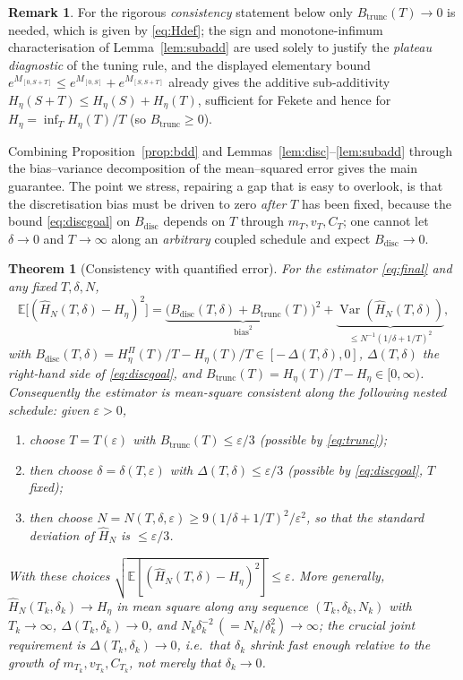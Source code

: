\documentclass{amsart}
\newtheorem{theorem}{Theorem}
\theoremstyle{definition}
\newtheorem{remark}{Remark}
\DeclareMathOperator{\Var}{Var}
\newcommand{\E}{\mathbb{E}}
\begin{document}
\begin{remark}\label{rem:fekete}
For the rigorous \emph{consistency} statement below only $B_{\mathrm{trunc}}(T)\to0$
is needed, which is given by \eqref{eq:Hdef}; the sign and monotone-infimum
characterisation of Lemma~\ref{lem:subadd} are used solely to justify the
\emph{plateau diagnostic} of the tuning rule, and the displayed elementary bound
$e^{M_{[0,S+T]}}\le e^{M_{[0,S]}}+e^{M_{[S,S+T]}}$ already gives the additive
sub-additivity $H_\eta(S+T)\le H_\eta(S)+H_\eta(T)$, sufficient for Fekete and hence
for $H_\eta=\inf_{T}H_\eta(T)/T$ (so $B_{\mathrm{trunc}}\ge0$).
\end{remark}

Combining Proposition~\ref{prop:bdd} and Lemmas~\ref{lem:disc}--\ref{lem:subadd}
through the bias--variance decomposition of the mean--squared error gives the main
guarantee. The point we stress, repairing a gap that is easy to overlook, is that
the discretisation bias must be driven to zero \emph{after} $T$ has been fixed,
because the bound \eqref{eq:discgoal} on $B_{\mathrm{disc}}$ depends on $T$ through
$m_T,v_T,C_T$; one cannot let $\delta\to0$ and $T\to\infty$ along an \emph{arbitrary}
coupled schedule and expect $B_{\mathrm{disc}}\to0$.

\begin{theorem}[Consistency with quantified error]\label{thm:main}
For the estimator \eqref{eq:final} and any fixed $T,\delta,N$,
\begin{equation}\label{eq:mse}
   \E\big[(\widehat H_N(T,\delta)-H_\eta)^2\big]
   =\underbrace{\big(B_{\mathrm{disc}}(T,\delta)+B_{\mathrm{trunc}}(T)\big)^2}_{\text{bias}^2}
   +\underbrace{\Var(\widehat H_N(T,\delta))}_{\le N^{-1}(1/\delta+1/T)^2},
\end{equation}
with $B_{\mathrm{disc}}(T,\delta)=H_\eta^\Pi(T)/T-H_\eta(T)/T\in[-\,\Delta(T,\delta),0]$,
$\Delta(T,\delta)$ the right-hand side of \eqref{eq:discgoal}, and
$B_{\mathrm{trunc}}(T)=H_\eta(T)/T-H_\eta\in[0,\infty)$.
Consequently the estimator is mean-square consistent along the following
\emph{nested} schedule: given $\varepsilon>0$,
\begin{enumerate}
\item choose $T=T(\varepsilon)$ with $B_{\mathrm{trunc}}(T)\le\varepsilon/3$
   (possible by \eqref{eq:trunc});
\item \emph{then} choose $\delta=\delta(T,\varepsilon)$ with
   $\Delta(T,\delta)\le\varepsilon/3$ (possible by \eqref{eq:discgoal}, $T$ fixed);
\item \emph{then} choose $N=N(T,\delta,\varepsilon)\ge 9(1/\delta+1/T)^2/\varepsilon^2$,
   so that the standard deviation of $\widehat H_N$ is $\le\varepsilon/3$.
\end{enumerate}
With these choices $\sqrt{\E[(\widehat H_N(T,\delta)-H_\eta)^2]}\le\varepsilon$.
More generally, $\widehat H_N(T_k,\delta_k)\to H_\eta$ in mean square along
\emph{any} sequence $(T_k,\delta_k,N_k)$ with $T_k\to\infty$,
$\Delta(T_k,\delta_k)\to0$, and $N_k\delta_k^{-2}\,(=N_k/\delta_k^2)\to\infty$; the
crucial joint requirement is $\Delta(T_k,\delta_k)\to0$, i.e.\ that $\delta_k$
shrink fast enough relative to the growth of $m_{T_k},v_{T_k},C_{T_k}$, not merely
that $\delta_k\to0$.
\end{theorem}
\end{document}
